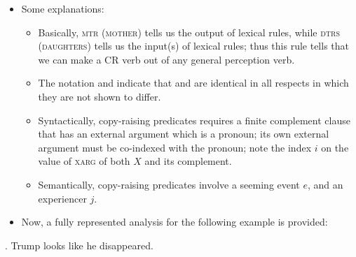 \documentclass[11pt]{article}
\begin{document}
\begin{itemize}
\item Some explanations:
\begin{itemize}
    \item Basically, \textsc{mtr} (\textsc{mother}) tells us the output of lexical rules, while \textsc{dtrs} (\textsc{daughters}) tells us the input(s) of lexical rules; thus this rule tells that we can make a CR verb out of any general perception verb.
    \item  The notation  and  indicate that \avm{[A]} and \avm{[B]} are identical in all respects in which they are not shown to differ.
    \item  Syntactically, copy-raising predicates requires a finite complement clause that has an external argument which is a pronoun; its own external argument must be co-indexed with the pronoun; note the index \(i\) on the value of \textsc{xarg} of both \(X\) and its complement.
    \item Semantically, copy-raising predicates involve a seeming event \(e\), and an experiencer \(j\).
\end{itemize}

\item Now, a fully represented analysis for the following example is provided:
\end{itemize}
\ex. Trump looks like he disappeared.
\end{document}
